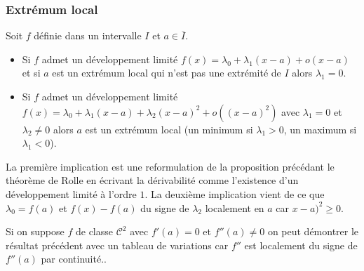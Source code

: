 \subsubsection{Extrémum local}
\begin{prop}
Soit $f$ définie dans un intervalle $I$ et $a \in \overline{I}$. 
\begin{itemize}
  \item Si $f$ admet un développement limité $f(x) = \lambda_0 + \lambda_1(x-a) + o(x-a)$ et si $a$ est un extrémum local qui n'est pas une extrémité de $I$ alors $\lambda_1 = 0$.
  \item Si $f$ admet un développement limité $f(x) = \lambda_0 + \lambda_1(x-a) + \lambda_2(x-a)^2 + o((x-a)^2)$ avec $\lambda_1 = 0$ et $\lambda_2 \neq 0$ alors $a$ est un extrémum local (un minimum si $\lambda_1 >0$, un maximum si $\lambda_1 < 0$).
\end{itemize}
\end{prop}
 
\begin{demo}
 La première implication est une reformulation de la proposition précédant le théorème de Rolle en écrivant la dérivabilité comme l'existence d'un développement limité à l'ordre $1$.\newline
 La deuxième implication vient de ce que $\lambda_0 = f(a)$ et $f(x) - f(a)$ du signe de $\lambda_2$ localement en $a$ car $x-a)^2\geq 0$.
\end{demo}
\begin{rem}
 Si on suppose $f$ de classe $\mathcal{C}^2$ avec $f'(a) = 0$ et $f''(a)\neq 0$ on peut démontrer le résultat précédent avec un tableau de variations car $f''$ est localement du signe de $f''(a)$ par continuité..
\end{rem}

